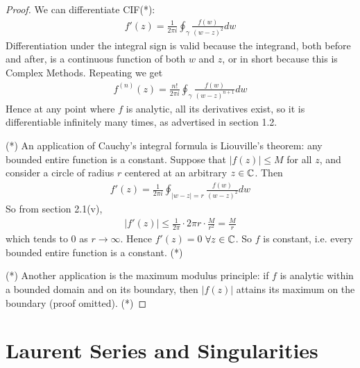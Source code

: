\documentclass[a4paper]{article}
\begin{document}
\begin{proof}
We can differentiate CIF(*):
\begin{equation*}
\begin{aligned}f'(z) = \frac{1}{2\pi i}\oint_\gamma \frac{f(w)}{(w-z)^2} dw
\end{aligned}
\end{equation*}
Differentiation under the integral sign is valid because the integrand, both before and after, is a continuous function of both $w$ and $z$, or in short because this is Complex Methods. Repeating we get
\begin{equation*}
\begin{aligned}
f^{(n)}(z) = \frac{n!}{2\pi i} \oint_\gamma \frac{f(w)}{(w-z)^{n+1}} dw
\end{aligned}
\end{equation*}
Hence at any point where $f$ is analytic, all its derivatives exist, so it is differentiable infinitely many times, as advertised in section 1.2.

(*) An application of Cauchy's integral formula is Liouville's theorem: any bounded entire function is a constant. Suppose that $|f(z)| \leq M$ for all $z$, and consider a circle of radius $r$ centered at an arbitrary $z \in \mathbb{C}$. Then
\begin{equation*}
\begin{aligned}
f'(z) = \frac{1}{2\pi i} \oint_{|w-z|=r} \frac{f(w)}{(w-z)^2} dw
\end{aligned}
\end{equation*}
So from section 2.1(v),
\begin{equation*}
\begin{aligned}
|f'(z)| \leq \frac{1}{2\pi} \cdot 2\pi r \cdot \frac{M}{r^2} = \frac{M}{r}
\end{aligned}
\end{equation*}
which tends to $0$ as $r \to \infty$. Hence $f'(z) = 0$ $\forall z \in \mathbb{C}$. So $f$ is constant, i.e. every bounded entire function is a constant. (*)

(*) Another application is the maximum modulus principle: if $f$ is analytic within a bounded domain and on its boundary, then $|f(z)|$ attains its maximum on the boundary (proof omitted). (*)

\end{proof}

\newpage

\section{Laurent Series and Singularities}
\end{document}
